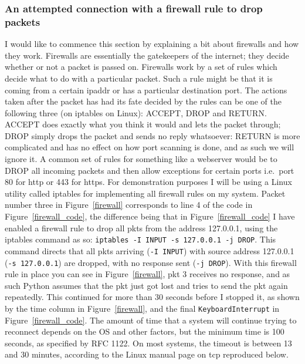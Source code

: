 \documentclass[titlepage]{article}
\let\Oldsubsubsection\subsubsection{}
\renewcommand{\subsubsection}{\FloatBarrier\Oldsubsubsection}
\begin{document}
\subsubsection{An attempted connection with a firewall rule to drop packets}
I would like to commence this section by explaining a bit about firewalls and how they work.
Firewalls are essentially the gatekeepers of the internet;
they decide whether or not a packet is passed on.
Firewalls work by a set of rules which decide what to do with a particular packet.
Such a rule might be that it is coming from a certain \gls{ipaddr} or has a particular destination port.
The actions taken after the packet has had its fate decided by the rules can be one
of the following three (on iptables on Linux):
ACCEPT, DROP and RETURN.\@
ACCEPT does exactly what you think it would and lets the packet through;
DROP simply drops the packet and sends no reply whatsoever:
RETURN is more complicated and has no effect on how port scanning is done,
and as such we will ignore it. A common set of rules for something like a webserver
would be to DROP all incoming packets and then allow exceptions for 
certain ports i.e.\ port 80 for \gls{http} or 443 for \gls{https}.
For demonstration purposes I will be using a Linux utility called iptables for
implementing all firewall rules on my system.
Packet number three in Figure~\ref{firewall} corresponds to line 4 of the code in Figure~\ref{firewall_code},
the difference being that in Figure~\ref{firewall_code} I have enabled a firewall rule to drop all \glspl{pkt} from the 
address 127.0.0.1, using the iptables command as so: \verb$iptables -I INPUT -s 127.0.0.1 -j DROP$. 
This command directs that all \glspl{pkt} arriving (\verb|-I INPUT|) with source address 127.0.0.1 
(\verb|-s 127.0.0.1|) are dropped, with no response sent (\verb|-j DROP|)\cite{man:iptables}. With this firewall rule in 
place you can see in Figure~\ref{firewall}, \gls{pkt} 3 receives no response, and as such Python 
assumes that the \gls{pkt} just got lost and tries to send the \gls{pkt} again repeatedly.
This continued for more than 30 seconds before I stopped it, as shown by the time column in 
Figure~\ref{firewall}, and the final \verb|KeyboardInterrupt| in Figure~\ref{firewall_code}.
The amount of time that a system will continue trying to reconnect depends on the OS and other 
factors, but the minimum time is 100 seconds, as specified by RFC 1122\cite{rfc:hostrequirements}.
On most systems, the timeout is between 13 and 30 minutes, according to the Linux
manual page on \gls{tcp} reproduced below\cite{man:tcp}.
\end{document}

